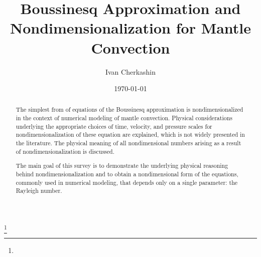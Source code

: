 \documentclass[oneside]{amsbook}
\theoremstyle{definition}
\theoremstyle{remark}
\numberwithin{section}{chapter}
\numberwithin{equation}{chapter}
\begin{document}
\frontmatter

\title{Boussinesq Approximation and Nondimensionalization for Mantle Convection}


\author{Ivan Cherkashin}
\address{University of California, Davis}
\curraddr{}

\address{}
\curraddr{}
\thanks{}



\date{\today}

\begin{abstract}

The simplest from of equations of the Boussinesq approximation is nondimensionalized in the context of numerical modeling of mantle convection. Physical considerations underlying the appropriate choices of time, velocity, and pressure scales for nondimensionalization of these equation are explained, which is not widely presented in the literature. The physical meaning of all nondimensional numbers arising as a result of nondimensionalization is discussed. 

The main goal of this survey is to demonstrate the underlying physical reasoning behind nondimensionalization and to obtain a nondimensional form of the equations, commonly used in numerical modeling, that depends only on a single parameter: the Rayleigh number.

\end{abstract}

\maketitle

\end{document}
